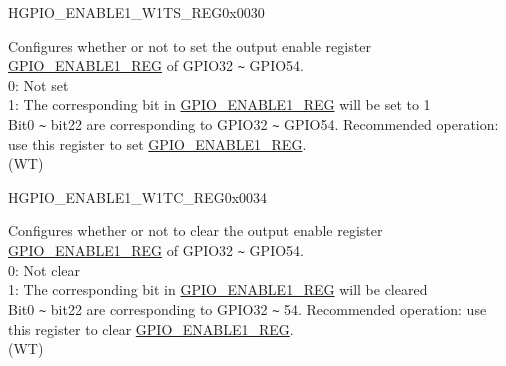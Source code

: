 \begin{register}{H}{GPIO\_ENABLE1\_W1TS\_REG}{0x0030}\label{regdesc:GPIOENABLE1W1TSREG}
%
%
\regnewline%
\begin{regdesc}\begin{reglist}
\label{fielddesc:GPIOENABLE1W1TS}\item [GPIO\_ENABLE1\_W1TS] Configures whether or not to set the output enable register \hyperref[regdesc:GPIOENABLE1REG]{GPIO\_ENABLE1\_REG} of GPIO32 \verb+~+ GPIO54.\\
0: Not set\\
1: The corresponding bit in \hyperref[regdesc:GPIOENABLE1REG]{GPIO\_ENABLE1\_REG} will be set to 1\\
Bit0 \verb+~+ bit22 are corresponding to GPIO32 \verb+~+ GPIO54. Recommended operation: use this register to set \hyperref[regdesc:GPIOENABLE1REG]{GPIO\_ENABLE1\_REG}.\\
(WT)
\end{reglist}\end{regdesc}
\end{register}


\begin{register}{H}{GPIO\_ENABLE1\_W1TC\_REG}{0x0034}\label{regdesc:GPIOENABLE1W1TCREG}
%
%
\regnewline%
\begin{regdesc}\begin{reglist}
\label{fielddesc:GPIOENABLE1W1TC}\item [GPIO\_ENABLE1\_W1TC] Configures whether or not to clear the output enable register \hyperref[regdesc:GPIOENABLE1REG]{GPIO\_ENABLE1\_REG} of GPIO32 \verb+~+ GPIO54. \\
0: Not clear\\
1: The corresponding bit in \hyperref[regdesc:GPIOENABLE1REG]{GPIO\_ENABLE1\_REG} will be cleared\\
Bit0 \verb+~+ bit22 are corresponding to GPIO32 \verb+~+ 54. Recommended operation: use this register to clear \hyperref[regdesc:GPIOENABLE1REG]{GPIO\_ENABLE1\_REG}.\\
(WT)
\end{reglist}\end{regdesc}
\end{register}


